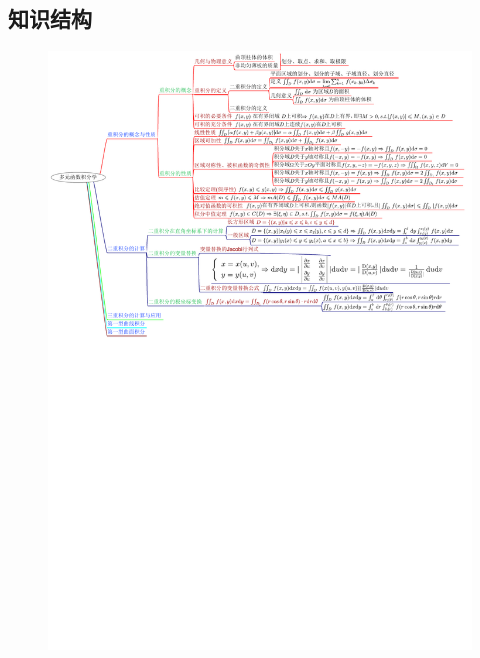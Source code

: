 \documentclass[12pt,UTF8]{ctexart}
\begin{document}
\subsection{知识结构}
\begin{figure}[H]
\begin{center}
\includegraphics[height=0.9\textheight,angle=0]{20190611-1.pdf}
\end{center}
\end{figure}
\end{document}
